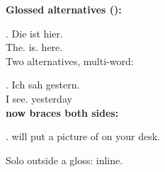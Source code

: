 \documentclass[11pt]{article}
\begin{document}
\noindent\textbf{Glossed alternatives (\texttt{\string\altg}):}

\exg. Die  ist hier.\\
      The.  is. here.\\

\noindent Two alternatives, multi-word:

\exg. Ich sah  gestern.\\
      I see.  yesterday\\

\noindent\textbf{\texttt{\string\altn} now braces both sides:}

\ex.  will put a picture of  on your desk.

\noindent Solo \texttt{\string\altg} outside a gloss:  inline.
\end{document}
